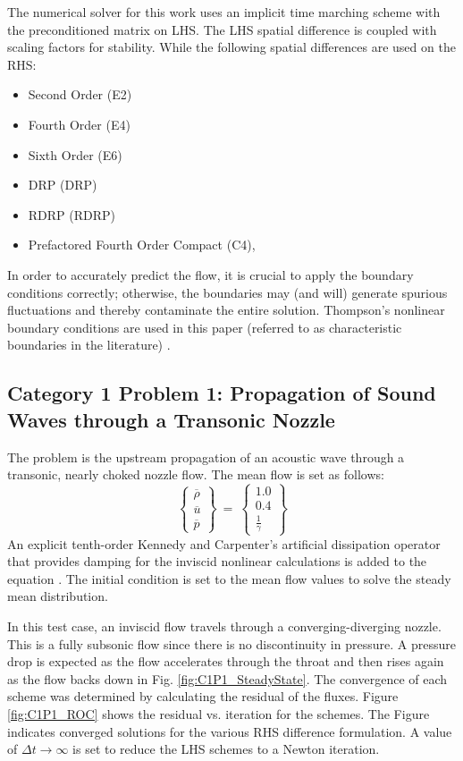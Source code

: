 \documentclass[conf]{new-aiaa}
\begin{document}
The numerical solver for this work uses an implicit time marching scheme with
the preconditioned matrix on LHS. 
The LHS spatial difference is coupled with scaling factors for stability. 
While the following spatial differences are used on the RHS:
\begin{itemize}
	\item Second Order (E2)
	\item Fourth Order (E4)
	\item Sixth Order (E6)
	\item DRP  (DRP)
	\item RDRP  (RDRP)
	\item Prefactored Fourth Order Compact (C4), \cite{Hixon_PreFactor}
\end{itemize}
In order to accurately predict the flow, it is crucial to apply the boundary conditions correctly; otherwise, the boundaries may (and will) generate spurious fluctuations and thereby contaminate the entire solution. 
Thompson's nonlinear boundary conditions are used in this paper (referred to as characteristic boundaries in the literature) \cite{Thompson1, Thompson2}.  

\subsection{Category 1 Problem 1: Propagation of Sound Waves through a Transonic Nozzle}

The problem is the upstream propagation of an acoustic wave through a transonic, nearly choked nozzle flow. 
The mean flow is set as follows:
\begin{equation*}
	\left\{
	\begin{matrix}
		\overline{\rho} \\
		\overline{u} \\
		\overline{p}
	\end{matrix}
	\right\}~=~
	\left\{
	\begin{matrix}
		1.0 \\
		0.4 \\
		\frac{1}{\gamma}
	\end{matrix}
	\right\}
\end{equation*}
An explicit tenth-order Kennedy and Carpenter's artificial dissipation operator that provides damping for the inviscid nonlinear calculations is added to the equation \cite{Kennedy_Carp}. The initial condition is set to the mean flow values to solve the steady mean distribution. 

In this test case, an inviscid flow travels through a converging-diverging nozzle. 
This is a fully subsonic flow since there is no discontinuity in pressure.
A pressure drop is expected as the flow accelerates through the throat and then rises again as the flow backs down in Fig. \ref{fig:C1P1_SteadyState}.  
The convergence of each scheme was determined by calculating the residual of the fluxes. 
Figure \ref{fig:C1P1_ROC} shows the residual vs. iteration for the schemes. 
The Figure indicates converged solutions for the various RHS difference formulation. 
A value of $\Delta{t}\to\infty$ is set to reduce the LHS schemes to a Newton iteration. 
\end{document}
